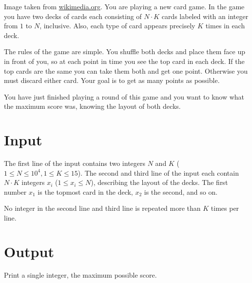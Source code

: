     {Image taken from \href{https://commons.wikimedia.org/wiki/File:7_playing_cards.jpg}{wikimedia.org}.}
You are playing a new card game.
In the game you have two decks of cards each consisting of $N \cdot K$ cards labeled with an integer from $1$ to $N$, inclusive.
Also, each type of card appears precisely $K$ times in each deck.

The rules of the game are simple.
You shuffle both decks and place them face up in front of you, so at each point in time you see the top card in each deck.
If the top cards are the same you can take them both and get one point.
Otherwise you must discard either card.
Your goal is to get as many points as possible.

You have just finished playing a round of this game and you want to know what the maximum score was,
    knowing the layout of both decks.

\section*{Input}
The first line of the input contains two integers $N$ and $K$ ($1 \leq N \leq 10^4, 1 \leq K \leq 15$).
The second and third line of the input each contain $N \cdot K$ integers $x_i$ ($1 \leq x_i \leq N$),
    describing the layout of the decks. The first number $x_1$ is the topmost card in the deck, $x_2$ is the second, and so on.

No integer in the second line and third line is repeated more than $K$ times per line.

\section*{Output}
Print a single integer, the maximum possible score.
